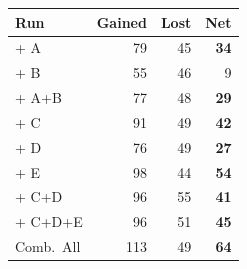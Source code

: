 \vspace{1em}
\noindent\begin{minipage}{\linewidth}
\centering
\addtocounter{table}{1}
\label{tab:p4-gained-lost-full}
\renewcommand{\arraystretch}{0.85}
\begin{tabular*}{\linewidth}{@{\extracolsep{\fill}}lrrr}
\toprule
Run & Gained & Lost & Net \\
\midrule
+ A & 79 & 45 & \textbf{34} \\
+ B & 55 & 46 & 9 \\
+ A+B & 77 & 48 & \textbf{29} \\
\midrule
+ C & 91 & 49 & \textbf{42} \\
+ D & 76 & 49 & \textbf{27} \\
+ E & 98 & 44 & \textbf{54} \\
+ C+D & 96 & 55 & \textbf{41} \\
+ C+D+E & 96 & 51 & \textbf{45} \\
\midrule
Comb.\ All & 113 & 49 & \textbf{64} \\
\bottomrule
\end{tabular*}
\end{minipage}
\vspace{1em}
